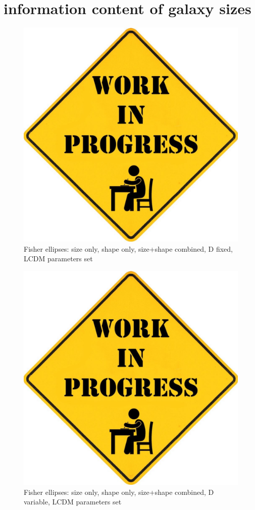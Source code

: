 \documentclass[a4paper,fleqn,usenatbib]{mnras}
\begin{document}
\section{information content of galaxy sizes}\label{sect_fisher}
\begin{figure}
    \centering
    \includegraphics[scale=0.1]{wip.jpg}
    \caption{Fisher ellipses: size only, shape only, size+shape combined, D fixed, LCDM parameters set}
    \label{fig:fisher}
\end{figure}
\begin{figure}
    \centering
    \includegraphics[scale=0.1]{wip.jpg}
    \caption{Fisher ellipses: size only, shape only, size+shape combined, D variable, LCDM parameters set}
    \label{fig:fisher}
\end{figure}
\end{document}

